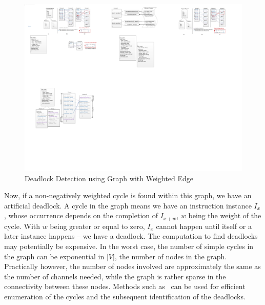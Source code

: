 \begin{figure}[htp]
\begin{center}
\includegraphics[width=0.7\linewidth]{chap4fig/singlelevelLoopCycle.pdf}
\caption{Deadlock Detection using Graph with Weighted Edge
\label{fig:singlelevelLoopCylce}}
\end{center}
\end{figure}

Now, if a non-negatively weighted cycle is found within this graph, we have an artificial deadlock.
A cycle in the graph means we have an instruction instance $I_x$, whose occurrence depends on the completion of $I_{x+w}$, $w$ being the weight of the cycle.
With $w$ being greater or equal to zero, $I_x$ cannot happen until itself or a later instance happens -- we have a deadlock. 
The computation to find deadlocks may potentially be expensive. In the worst case, the number
of simple cycles in the graph can be exponential in
$|V|$, the number of nodes in the graph. Practically however, the number of
nodes involved are approximately the same as the number of channels needed, while the graph is rather sparse in the connectivity between these nodes. 
Methods such as~\cite{doi:10.1137/0204007} can be used for efficient
enumeration of the cycles and the subsequent identification of the deadlocks.



